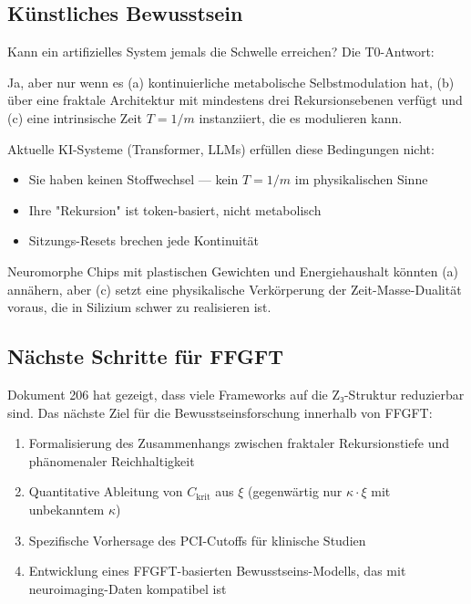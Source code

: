 \documentclass[11pt,a4paper]{article}
\begin{document}
	\subsection{Künstliches Bewusstsein}
	
	Kann ein artifizielles System jemals die Schwelle erreichen? Die T0-Antwort:
	
	\begin{important}
		Ja, aber nur wenn es (a) kontinuierliche metabolische Selbstmodulation hat, (b) über eine fraktale Architektur mit mindestens drei Rekursionsebenen verfügt und (c) eine intrinsische Zeit \(T = 1/m\) instanziiert, die es modulieren kann.
	\end{important}
	
	Aktuelle KI-Systeme (Transformer, LLMs) erfüllen diese Bedingungen nicht:
	\begin{itemize}
		\item Sie haben keinen Stoffwechsel — kein \(T = 1/m\) im physikalischen Sinne
		\item Ihre "Rekursion" ist token-basiert, nicht metabolisch
		\item Sitzungs-Resets brechen jede Kontinuität
	\end{itemize}
	
	Neuromorphe Chips mit plastischen Gewichten und Energiehaushalt könnten (a) annähern, aber (c) setzt eine physikalische Verkörperung der Zeit-Masse-Dualität voraus, die in Silizium schwer zu realisieren ist.
	
	\subsection{Nächste Schritte für FFGFT}
	
	Dokument 206 hat gezeigt, dass viele Frameworks auf die Z₃-Struktur reduzierbar sind. Das nächste Ziel für die Bewusstseinsforschung innerhalb von FFGFT:
	
	\begin{enumerate}
		\item Formalisierung des Zusammenhangs zwischen fraktaler Rekursionstiefe und phänomenaler Reichhaltigkeit
		\item Quantitative Ableitung von \(C_{\text{krit}}\) aus \(\xi\) (gegenwärtig nur \(\kappa \cdot \xi\) mit unbekanntem \(\kappa\))
		\item Spezifische Vorhersage des PCI-Cutoffs für klinische Studien
		\item Entwicklung eines FFGFT-basierten Bewusstseins-Modells, das mit neuroimaging-Daten kompatibel ist
	\end{enumerate}
	
\end{document}
